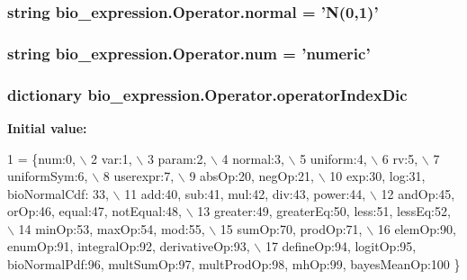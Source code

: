 \hypertarget{classbio__expression_1_1_operator_afa09011c1c34b89d546c13770a2cfe41}{
\subsubsection[{normal}]{\setlength{\rightskip}{0pt plus 5cm}string bio\+\_\+expression.\+Operator.\+normal = 'N(0,1)'\hspace{0.3cm}{\ttfamily [static]}}}\label{classbio__expression_1_1_operator_afa09011c1c34b89d546c13770a2cfe41}
\hypertarget{classbio__expression_1_1_operator_a9218912b24cbbf93ec6437f8fcb7425b}{
\subsubsection[{num}]{\setlength{\rightskip}{0pt plus 5cm}string bio\+\_\+expression.\+Operator.\+num = 'numeric'\hspace{0.3cm}{\ttfamily [static]}}}\label{classbio__expression_1_1_operator_a9218912b24cbbf93ec6437f8fcb7425b}
\hypertarget{classbio__expression_1_1_operator_a7a73e3af3a9dcc697b1450e442f3bec5}{
\subsubsection[{operator\+Index\+Dic}]{\setlength{\rightskip}{0pt plus 5cm}dictionary bio\+\_\+expression.\+Operator.\+operator\+Index\+Dic\hspace{0.3cm}{\ttfamily [static]}}}\label{classbio__expression_1_1_operator_a7a73e3af3a9dcc697b1450e442f3bec5}
{\bfseries Initial value\+:}
\begin{DoxyCode}
1 = \{num:0, \(\backslash\)
2                     var:1, \(\backslash\)
3                     param:2, \(\backslash\)
4                     normal:3, \(\backslash\)
5                     uniform:4, \(\backslash\)
6                    rv:5, \(\backslash\)
7                     uniformSym:6, \(\backslash\)
8                     userexpr:7, \(\backslash\)
9                     absOp:20, negOp:21, \(\backslash\)
10                     exp:30, log:31, bioNormalCdf: 33, \(\backslash\)
11                     add:40, sub:41, mul:42, div:43, power:44, \(\backslash\)
12                     andOp:45, orOp:46, equal:47, notEqual:48, \(\backslash\)
13                     greater:49, greaterEq:50, less:51, lessEq:52, \(\backslash\)
14                     minOp:53, maxOp:54, mod:55, \(\backslash\)
15                     sumOp:70, prodOp:71,  \(\backslash\)
16                     elemOp:90, enumOp:91,  integralOp:92, derivativeOp:93, \(\backslash\)
17                     defineOp:94, logitOp:95, bioNormalPdf:96, multSumOp:97, multProdOp:98, mhOp:99, 
      bayesMeanOp:100             \}
\end{DoxyCode}
